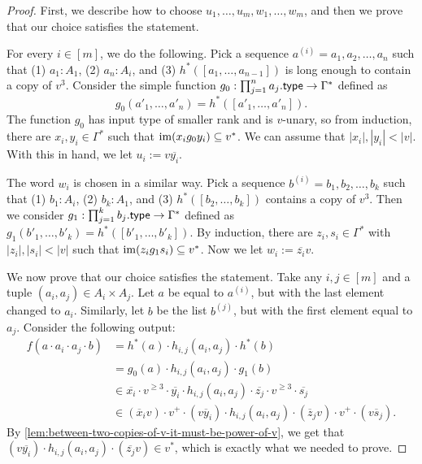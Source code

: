 \begin{proof}
    First, we describe how to choose $u_1, \dots, u_m, w_1, \dots, w_m$, and then we prove that our choice satisfies the statement. 

    For every $i \in [m]$, we do the following. Pick a sequence $a^{(i)} = a_1, a_2, \dots, a_n$ such that (1) $a_1 : A_1$, (2) $a_n : A_i$, and (3) $h^*([a_1, \dots, a_{n-1}])$ is long enough to contain a copy of $v^3$. Consider the simple function $g_0 : \prod_{j=1}^n a_j . \mathsf{type} \to \Gamma^*$ defined as 
    \[
        g_0(a'_1, \dots, a'_n) = h^*([a'_1, \dots, a'_n]).
    \]
    The function $g_0$ has input type of smaller rank and is $v$-unary, so from induction, there are $x_i, y_i \in \Gamma^*$ such that $\operatorname{\mathrm{im}}(x_i g_0 y_i) \subseteq v^*$. We can assume that $|x_i|, |y_i| < |v|$. With this in hand, we let $u_i := v \overline{y_i}$.  

    The word $w_i$ is chosen in a similar way. Pick a sequence $b^{(i)} = b_1, b_2, \dots, b_k$ such that (1) $b_1 : A_i$, (2) $b_k : A_1$, and (3) $h^*([b_2, \dots, b_k])$ contains a copy of $v^3$. Then we consider $g_1 : \prod_{j=1}^k b_j . \mathsf{type} \to \Gamma^*$ defined as $g_1(b'_1, \dots, b'_k) = h^*([b'_1, \dots, b'_k])$. By induction, there are $z_i, s_i \in \Gamma^*$ with $|z_i|, |s_i| < |v|$ such that $\operatorname{\mathrm{im}}(z_i g_1 s_i) \subseteq v^*$. Now we let $w_i := \overline{z_i} v$.  

    We now prove that our choice satisfies the statement. Take any $i,j \in [m]$ and a tuple $(a_i, a_j) \in A_i \times A_j$. Let $a$ be equal to $a^{(i)}$, but with the last element changed to $a_i$. Similarly, let $b$ be the list $b^{(j)}$, but with the first element equal to $a_j$. Consider the following output:
    \begin{align*}
        f(a \cdot a_i \cdot a_j \cdot b) &= h^*(a) \cdot h_{i,j}(a_i, a_j) \cdot h^*(b) \\ 
                                         &= g_0(a) \cdot h_{i,j}(a_i, a_j) \cdot g_1(b) \\ 
                                         &\in \overline{x_i} \cdot v^{\geq 3} \cdot \overline{y_i} \cdot h_{i,j}(a_i, a_j) \cdot \overline{z_j} \cdot v^{\geq 3} \cdot \overline{s_j} \\ 
                                         &\in (\overline x_i v) \cdot v^+ \cdot (v \overline y_i) \cdot h_{i,j}(a_i, a_j) \cdot (\overline z_j v) \cdot v^+ \cdot (v \overline s_j).
    \end{align*}
    By \cref{lem:between-two-copies-of-v-it-must-be-power-of-v}, we get that $(v \overline{y_i}) \cdot h_{i,j}(a_i, a_j) \cdot (\overline{z_j} v) \in v^*$, which is exactly what we needed to prove.
\end{proof}

